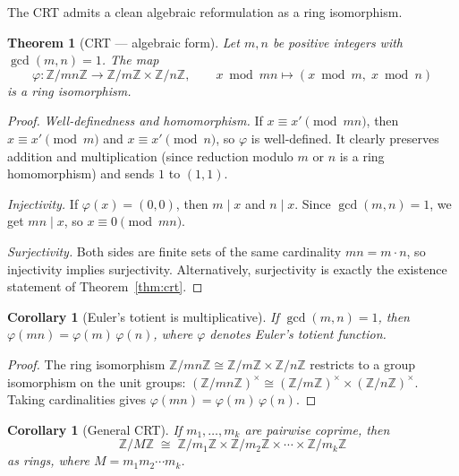 \documentclass[12pt,a4paper,openany]{book}
\theoremstyle{definition}
\theoremstyle{plain}
\newtheorem{theorem}[definition]{Theorem}
\newtheorem{corollary}[definition]{Corollary}
\theoremstyle{remark}
\newcommand{\Z}{\mathbb{Z}}
\begin{document}
The CRT admits a clean algebraic reformulation as a ring isomorphism.

\begin{theorem}[CRT --- algebraic form]
\label{thm:crt-algebraic}
Let $m, n$ be positive integers with $\gcd(m, n) = 1$. The map
\begin{equation}
\label{eq:crt-iso}
  \varphi \colon \Z / mn\Z \longrightarrow \Z / m\Z \times \Z / n\Z, \qquad
  x \bmod{mn} \longmapsto (x \bmod{m},\; x \bmod{n})
\end{equation}
is a ring isomorphism.
\end{theorem}

\begin{proof}
\emph{Well-definedness and homomorphism.} If $x \equiv x' \pmod{mn}$, then
$x \equiv x' \pmod{m}$ and $x \equiv x' \pmod{n}$, so $\varphi$ is well-defined.
It clearly preserves addition and multiplication (since reduction modulo $m$ or $n$
is a ring homomorphism) and sends $1$ to $(1, 1)$.

\emph{Injectivity.} If $\varphi(x) = (0, 0)$, then $m \mid x$ and $n \mid x$.
Since $\gcd(m, n) = 1$, we get $mn \mid x$, so $x \equiv 0 \pmod{mn}$.

\emph{Surjectivity.} Both sides are finite sets of the same cardinality
$mn = m \cdot n$, so injectivity implies surjectivity.
Alternatively, surjectivity is exactly the existence statement of
Theorem~\ref{thm:crt}.
\end{proof}

\begin{corollary}[Euler's totient is multiplicative]
\label{cor:euler-multiplicative}
If $\gcd(m, n) = 1$, then $\varphi(mn) = \varphi(m)\,\varphi(n)$,
where $\varphi$ denotes Euler's totient function.
\end{corollary}

\begin{proof}
The ring isomorphism $\Z/mn\Z \cong \Z/m\Z \times \Z/n\Z$ restricts to a
group isomorphism on the unit groups:
$(\Z/mn\Z)^\times \cong (\Z/m\Z)^\times \times (\Z/n\Z)^\times$.
Taking cardinalities gives $\varphi(mn) = \varphi(m)\,\varphi(n)$.
\end{proof}

\begin{corollary}[General CRT]
\label{cor:crt-general}
If $m_1, \ldots, m_k$ are pairwise coprime, then
\[
  \Z / M\Z \;\cong\; \Z/m_1\Z \times \Z/m_2\Z \times \cdots \times \Z/m_k\Z
\]
as rings, where $M = m_1 m_2 \cdots m_k$.
\end{corollary}
\end{document}
